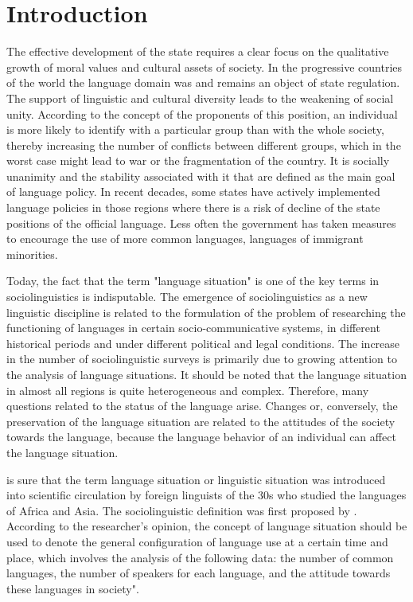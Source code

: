 \documentclass[english]{textolivre}
\begin{document}
\section{Introduction}

The effective development of the state requires a clear focus on the qualitative growth of moral values and cultural assets of society. In the progressive countries of the world the language domain was and remains an object of state regulation. The support of linguistic and cultural diversity leads to the weakening of social unity. According to the concept of the proponents of this position, an individual is more likely to identify with a particular group than with the whole society, thereby increasing the number of conflicts between different groups, which in the worst case might lead to war or the fragmentation of the country. It is socially unanimity and the stability associated with it that are defined as the main goal of language policy. In recent decades, some states have actively implemented language policies in those regions where there is a risk of decline of the state positions of the official language. Less often the government has taken measures to encourage the use of more common languages, languages of immigrant minorities.

Today, the fact that the term "language situation" is one of the key terms in sociolinguistics is indisputable. The emergence of sociolinguistics as a new linguistic discipline is related to the formulation of the problem of researching the functioning of languages in certain socio-communicative systems, in different historical periods and under different political and legal conditions. The increase in the number of sociolinguistic surveys is primarily due to growing attention to the analysis of language situations. It should be noted that the language situation in almost all regions is quite heterogeneous and complex. Therefore, many questions related to the status of the language arise. Changes or, conversely, the preservation of the language situation are related to the attitudes of the society towards the language, because the language behavior of an individual can affect the language situation.

\textcite{zhovnirenko2013} is sure that the term language situation or linguistic situation was introduced into scientific circulation by foreign linguists of the 30s who studied the languages of Africa and Asia. The sociolinguistic definition was first proposed by \textcite{forgoson1959}. According to the researcher's opinion, the concept of language situation should be used to denote the general configuration of language use at a certain time and place, which involves the analysis of the following data: the number of common languages, the number of speakers for each language, and the attitude towards these languages in society".
\end{document}

